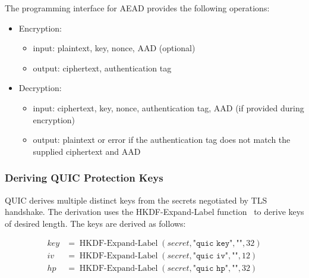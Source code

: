 The programming interface for AEAD provides the following operations:

\begin{itemize}

  \item Encryption:

  \begin{itemize}

    \item input: plaintext, key, nonce, AAD (optional)

    \item output: ciphertext, authentication tag

  \end{itemize}

  \item Decryption:

  \begin{itemize}

    \item input: ciphertext, key, nonce, authentication tag, AAD (if provided during encryption)

    \item output: plaintext or error if the authentication tag does not match the supplied
ciphertext and AAD

  \end{itemize}

\end{itemize}

\subsubsection{Deriving QUIC Protection Keys}\label{sec:02-encryption-key-derivation}

QUIC derives multiple distinct keys from the secrets negotiated by TLS handshake. The derivation
uses the HKDF-Expand-Label function~\cite{rfc5869} to derive keys of desired length. The keys are
derived as follows:

\begin{equation*}
  \begin{split}
    key & = \operatorname{HKDF-Expand-Label}(secret, \texttt{"quic key"}, \texttt{""}, 32) \\
    iv & = \operatorname{HKDF-Expand-Label}(secret, \texttt{"quic iv"}, \texttt{""}, 12) \\
    hp & = \operatorname{HKDF-Expand-Label}(secret, \texttt{"quic hp"}, \texttt{""}, 32) \\
  \end{split}
\end{equation*}

